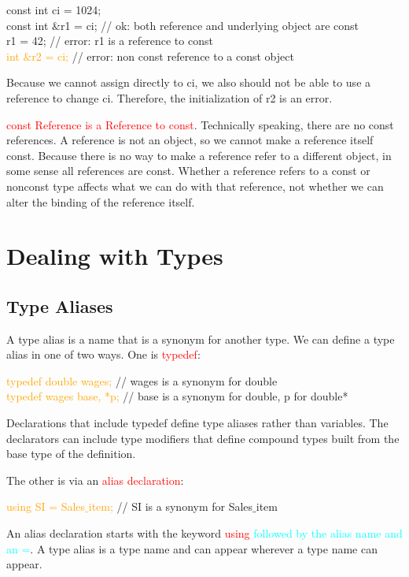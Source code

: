 \documentclass[12pt,a4paper]{article}
\begin{document}
const int ci = 1024; \\
const int $\&$r1 = ci; // ok: both reference and underlying object are const  \\
r1 = 42; // error: r1 is a reference to const \\
\textcolor{orange}{int $\&$r2 = ci;} // error: non const reference to a const object

Because we cannot assign directly to ci, we also should not be able to use a reference to change ci. Therefore, the initialization of r2 is an error.

\textcolor{red}{const Reference is a Reference to const}. Technically speaking, there are no const references. A reference is not an object, so we cannot make a reference itself const. Because there is no way to make a reference refer to a different object, in some sense all references are const. Whether a reference refers to a const or nonconst type affects what we can do with that reference, not whether we can alter the binding of the reference itself.


\section{Dealing with Types}

\subsection{Type Aliases}
A type alias is a name that is a synonym for another type. We can define a type alias in one of two ways. One is \textcolor{red}{typedef}:

\textcolor{orange}{typedef double wages;} // wages is a synonym for double \\
\textcolor{orange}{typedef wages base, *p;} // base is a synonym for double, p for double*

Declarations that include typedef define type aliases rather than variables. The declarators can include type modifiers that define compound types built from the base type of the definition.

The other is via an \textcolor{red}{alias declaration}:

\textcolor{orange}{using SI = Sales$\_$item;} // SI is a synonym for Sales$\_$item

An alias declaration starts with the keyword \textcolor{red}{using} \textcolor{cyan}{followed by the alias name and an =}. A type alias is a type name and can appear wherever a type name can appear.
\end{document}
